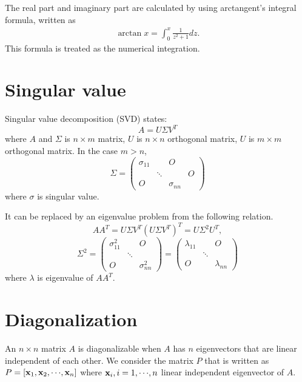 \documentclass[dvipdfmx]{article}
\begin{document}
The real part and imaginary part are calculated by using arctangent's integral formula, written as
 \begin{eqnarray}
 \arctan{x} = {\int_0^x} \frac{1}{z^2 + 1} dz. \nonumber
 \end{eqnarray}
 This formula is treated as the numerical integration.
 
 
\section*{Singular value}
Singular value decomposition (SVD) states:
$$
A = U {\Sigma} V^T
$$
where $A$ and ${\Sigma}$ is ${n{\times}m}$ matrix, $U$ is ${n{\times}n}$ orthogonal matrix, $U$ is ${m{\times}m}$ orthogonal matrix.
In the case $m > n$,
 \[
   {\Sigma} =
   \left(
   \begin{array}{ccc|c}
   {\sigma}_{11} & \            & O                    & \ \\
   \                      & {\ddots} & \                     & O \\
   O                    & \            & {\sigma}_{nn} & \
   \end{array}
   \right) 
  \] 
  where ${\sigma}$ is singular value.

It can be replaced by an eigenvalue problem from the following relation.
$$
AA^T = U {\Sigma} V^T  (U {\Sigma} V^T)^T = U{\Sigma}^2U^T ,
$$
 \[
   {\Sigma}^2 =
   \left(
   \begin{array}{ccc}
   {\sigma}_{11}^2 & \            & O \\
   \                         & {\ddots} & \   \\
   O                       & \            & {\sigma}_{nn}^2
   \end{array}
   \right) =
   \left(
   \begin{array}{ccc}
   {\lambda}_{11} & \            & O \\
   \                       & {\ddots} & \   \\
   O                     & \            & {\lambda}_{nn}
   \end{array}
   \right) 
  \] 
  where $\lambda$ is eigenvalue of $AA^T$.
 

\section*{Diagonalization}
An $n{\times}n$ matrix $A$ is diagonalizable when $A$ has $n$ eigenvectors that are linear independent of each other.
We consider the matrix $P$ that is written as $P=[{\bf{x}}_1, {\bf{x}}_2, {\cdots}, {\bf{x}}_n]$ where ${\bf{x}}_i, i=1,{\cdots},n$ linear independent eigenvector of $A$.
\end{document}
